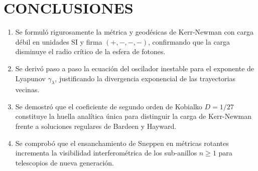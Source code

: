 \chapter{CONCLUSIONES}

\begin{enumerate}
    \item Se formuló rigurosamente la métrica y geodésicas de Kerr-Newman con carga débil en unidades SI y firma $(+,-,-,-)$, confirmando que la carga disminuye el radio crítico de la esfera de fotones.
    \item Se derivó paso a paso la ecuación del oscilador inestable para el exponente de Lyapunov $\gamma_\lambda$, justificando la divergencia exponencial de las trayectorias vecinas.
    \item Se demostró que el coeficiente de segundo orden de Kobialko $D = 1/27$ constituye la huella analítica única para distinguir la carga de Kerr-Newman frente a soluciones regulares de Bardeen y Hayward.
    \item Se comprobó que el ensanchamiento de Sneppen en métricas rotantes incrementa la visibilidad interferométrica de los sub-anillos $n \ge 1$ para telescopios de nueva generación.
\end{enumerate}

